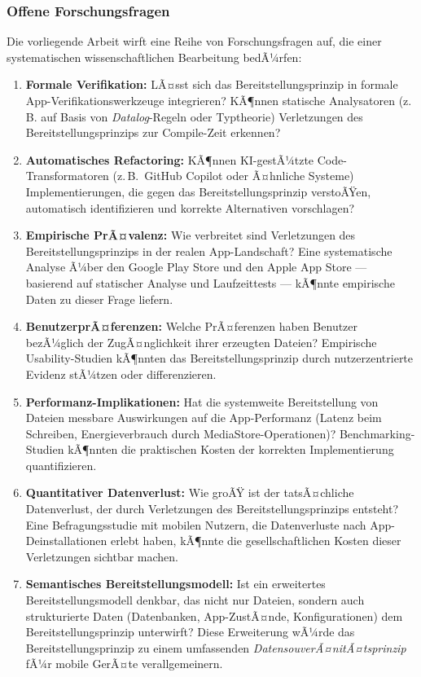 ﻿\documentclass[12pt, a4paper]{article}
\begin{document}
\subsubsection{Offene Forschungsfragen}

Die vorliegende Arbeit wirft eine Reihe von Forschungsfragen auf, die einer
systematischen wissenschaftlichen Bearbeitung bedÃ¼rfen:

\begin{enumerate}[label=\textbf{F\arabic*.}, leftmargin=*]
  \item \textbf{Formale Verifikation:} LÃ¤sst sich das Bereitstellungsprinzip in formale
    App-Verifi\-kationswerkzeuge integrieren? KÃ¶nnen statische Analysatoren (z.\,B. auf
    Basis von \emph{Datalog}-Regeln oder Typtheorie) Verletzungen des
    Bereitstellungsprinzips zur Compile-Zeit erkennen?
  \item \textbf{Automatisches Refactoring:} KÃ¶nnen KI-gestÃ¼tzte Code-Transformatoren
    (z.\,B.\ GitHub Copilot oder Ã¤hnliche Systeme) Implementierungen, die gegen das
    Bereitstellungsprinzip verstoÃŸen, automatisch identifizieren und korrekte Alternativen
    vorschlagen?
  \item \textbf{Empirische PrÃ¤valenz:} Wie verbreitet sind Verletzungen des
    Bereitstellungsprinzips in der realen App-Landschaft? Eine systematische Analyse
    Ã¼ber den Google Play Store und den Apple App Store --- basierend auf statischer
    Analyse und Laufzeittests --- kÃ¶nnte empirische Daten zu dieser Frage liefern.
  \item \textbf{BenutzerprÃ¤ferenzen:} Welche PrÃ¤ferenzen haben Benutzer bezÃ¼glich der
    ZugÃ¤nglichkeit ihrer erzeugten Dateien? Empirische Usability-Studien kÃ¶nnten das
    Bereitstellungsprinzip durch nutzerzentrierte Evidenz stÃ¼tzen oder differenzieren.
  \item \textbf{Performanz-Implikationen:} Hat die systemweite Bereitstellung von Dateien
    messbare Auswirkungen auf die App-Performanz (Latenz beim Schreiben,
    Energie\-verbrauch durch MediaStore-Operationen)? Benchmarking-Studien kÃ¶nnten die
    praktischen Kosten der korrekten Implementierung quantifizieren.
  \item \textbf{Quantitativer Datenverlust:} Wie groÃŸ ist der tatsÃ¤chliche Datenverlust,
    der durch Verletzungen des Bereitstellungsprinzips entsteht? Eine Befragungsstudie
    mit mobilen Nutzern, die Datenverluste nach App-Deinstallationen erlebt haben, kÃ¶nnte
    die gesellschaftlichen Kosten dieser Verletzungen sichtbar machen.
  \item \textbf{Semantisches Bereitstellungsmodell:} Ist ein erweitertes
    Bereitstellungsmodell denkbar, das nicht nur Dateien, sondern auch strukturierte Daten
    (Datenbanken, App-ZustÃ¤nde, Konfigurationen) dem Bereitstellungsprinzip unterwirft?
    Diese Erweiterung wÃ¼rde das Bereitstellungsprinzip zu einem umfassenden
    \emph{DatensouverÃ¤nitÃ¤tsprinzip} fÃ¼r mobile GerÃ¤te verallgemeinern.
\end{enumerate}
\end{document}
